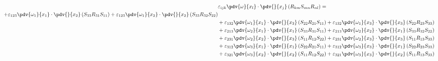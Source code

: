 \begin{equation}
	\begin{split}
		 & \varepsilon_{ijk}\pdv{\omega}{x_{l}} \cdot\pdv{}{x_{j}}\left(R_{km}S_{mn}R_{nl}\right) =  \\ 
		+\varepsilon_{123}\pdv{\omega_{1}}{x_{1}}\cdot\pdv{}{x_{2}}\left(S_{33}R_{31}S_{11}\right)
		+\varepsilon_{123}\pdv{\omega_{1}}{x_{2}}\cdot\pdv{}{x_{2}}\left(S_{33}R_{32}S_{22}\right)
		\\ 
&+\varepsilon_{132}\pdv{\omega_{1}}{x_{1}}\cdot\pdv{}{x_{3}}\left(S_{22}R_{21}S_{11}\right)
		+\varepsilon_{132}\pdv{\omega_{1}}{x_{3}}\cdot\pdv{}{x_{3}}\left(S_{22}R_{23}S_{33}\right)
		\\ 
&+\varepsilon_{213}\pdv{\omega_{2}}{x_{1}}\cdot\pdv{}{x_{1}}\left(S_{33}R_{31}S_{11}\right)
		+\varepsilon_{213}\pdv{\omega_{2}}{x_{2}}\cdot\pdv{}{x_{1}}\left(S_{33}R_{32}S_{22}\right)
		\\ 
&+\varepsilon_{231}\pdv{\omega_{2}}{x_{2}}\cdot\pdv{}{x_{3}}\left(S_{11}R_{12}S_{22}\right)
		+\varepsilon_{231}\pdv{\omega_{2}}{x_{3}}\cdot\pdv{}{x_{3}}\left(S_{11}R_{13}S_{33}\right)
		\\ 
&+\varepsilon_{312}\pdv{\omega_{3}}{x_{1}}\cdot\pdv{}{x_{1}}\left(S_{22}R_{21}S_{11}\right)
		+\varepsilon_{312}\pdv{\omega_{3}}{x_{3}}\cdot\pdv{}{x_{1}}\left(S_{22}R_{23}S_{33}\right)
		\\ 
&+\varepsilon_{321}\pdv{\omega_{3}}{x_{2}}\cdot\pdv{}{x_{2}}\left(S_{11}R_{12}S_{22}\right)
		+\varepsilon_{321}\pdv{\omega_{3}}{x_{3}}\cdot\pdv{}{x_{2}}\left(S_{11}R_{13}S_{33}\right)
	\end{split}
\end{equation}
